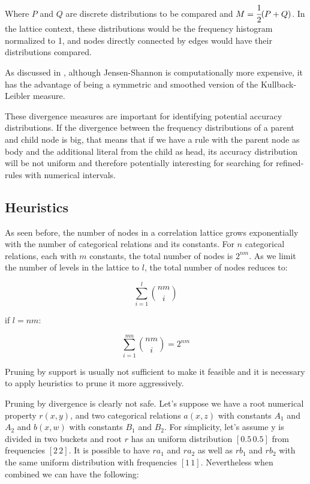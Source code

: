 Where $P$ and $Q$ are discrete distributions to be compared and $M=\cfrac{1}{2}(P+Q)$. In the lattice context, these
distributions would be the frequency histogram normalized to 1, and nodes directly connected by edges would have their
distributions compared.

As discussed in \cite{17795}, although Jensen-Shannon is computationally more expensive, it has the advantage of being
a
symmetric and smoothed version of the Kullback-Leibler measure.

These divergence measures are important for identifying potential accuracy distributions. If the divergence between
the
frequency distributions of a parent and child node is big, that means that if we have a rule with the parent node as
body and the additional literal from the child as head, its accuracy distribution will be not uniform and therefore
potentially interesting for searching for refined-rules with numerical intervals.


\subsection{Heuristics}
\label{sec:heuristics}

As seen before, the number of nodes in a correlation lattice grows exponentially with the number of categorical
relations and its constants. For $n$ categorical relations, each with $m$ constants, the total number of nodes is
$2^{nm}$. As we limit the number of levels in the lattice to $l$, the total number of nodes reduces to:

\begin{center}
  \begin{equation}
    \sum_{i=1}^{l}\binom{nm}{i}
  \end{equation}
\end{center}

if $l=nm$:

\begin{center}
  \begin{equation}
    \sum_{i=1}^{mn}\binom{nm}{i} = 2^{nm}
  \end{equation}
\end{center}


Pruning by support is usually not sufficient to make it feasible and it is necessary to apply
heuristics to prune it more aggressively.


Pruning by divergence is clearly not safe. Let's suppose we have a root numerical property $r(x,y)$, and two
categorical
relations $a(x,z)$ with constants $A_1$ and $A_2$ and $b(x,w)$ with constants $B_1$ and $B_2$. For simplicity, let's
assume y is divided in two buckets and root $r$ has an uniform distribution $[0.5 \, 0.5]$ from frequencies $[2 \,
2]$.
It is possible to have $r a_1$ and $r a_2$ as well as $r b_1$ and $r b_2$ with the same uniform distribution with
frequencies $[1 \, 1]$. Nevertheless when combined we can have the following:


